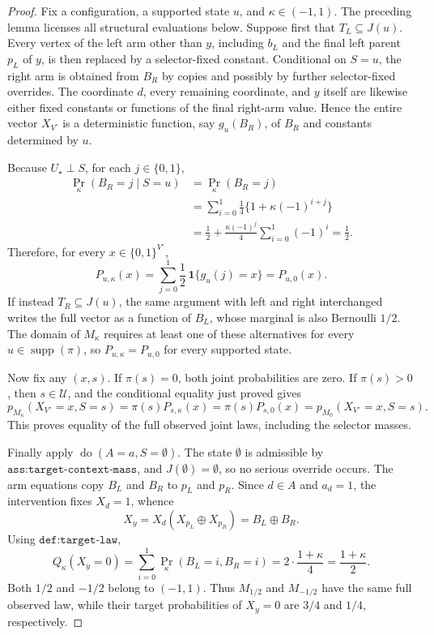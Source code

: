 \documentclass{article}
\begin{document}
\begin{proof}
Fix a configuration, a supported state \(u\), and \(\kappa\in(-1,1)\). The preceding lemma licenses all structural evaluations below. Suppose first that \(T_L\subseteq J(u)\). Every vertex of the left arm other than \(y\), including \(b_L\) and the final left parent \(p_L\) of \(y\), is then replaced by a selector-fixed constant. Conditional on \(S=u\), the right arm is obtained from \(B_R\) by copies and possibly by further selector-fixed overrides. The coordinate \(d\), every remaining coordinate, and \(y\) itself are likewise either fixed constants or functions of the final right-arm value. Hence the entire vector \(X_{V^\circ}\) is a deterministic function, say \(g_u(B_R)\), of \(B_R\) and constants determined by \(u\).

Because \(U_\star\perp S\), for each \(j\in\{0,1\}\),
\[
\begin{aligned}
\Pr_\kappa(B_R=j\mid S=u)
&=\Pr_\kappa(B_R=j)\\
&=\sum_{i=0}^1\frac14\{1+\kappa(-1)^{i+j}\}\\
&=\frac12+\frac{\kappa(-1)^j}{4}\sum_{i=0}^1(-1)^i=\frac12.
\end{aligned}
\]
Therefore, for every \(x\in\{0,1\}^{V^\circ}\),
\[
P_{u,\kappa}(x)=\sum_{j=0}^1\frac12\,\mathbf 1\{g_u(j)=x\}=P_{u,0}(x).
\]
If instead \(T_R\subseteq J(u)\), the same argument with left and right interchanged writes the full vector as a function of \(B_L\), whose marginal is also Bernoulli \(1/2\). The domain of \(M_\kappa\) requires at least one of these alternatives for every \(u\in\operatorname{supp}(\pi)\), so \(P_{u,\kappa}=P_{u,0}\) for every supported state.

Now fix any \((x,s)\). If \(\pi(s)=0\), both joint probabilities are zero. If \(\pi(s)>0\), then \(s\in\mathcal U\), and the conditional equality just proved gives
\[
p_{M_\kappa}(X_{V^\circ}=x,S=s)=\pi(s)P_{s,\kappa}(x)=\pi(s)P_{s,0}(x)=p_{M_0}(X_{V^\circ}=x,S=s).
\]
This proves equality of the full observed joint laws, including the selector masses.

Finally apply \(\operatorname{do}(A=a,S=\emptyset)\). The state \(\emptyset\) is admissible by \(\texttt{ass:target-context-mass}\), and \(J(\emptyset)=\emptyset\), so no serious override occurs. The arm equations copy \(B_L\) and \(B_R\) to \(p_L\) and \(p_R\). Since \(d\in A\) and \(a_d=1\), the intervention fixes \(X_d=1\), whence
\[
X_y=X_d(X_{p_L}\oplus X_{p_R})=B_L\oplus B_R.
\]
Using \(\texttt{def:target-law}\),
\[
Q_\kappa(X_y=0)=\sum_{i=0}^1\Pr_\kappa(B_L=i,B_R=i)=2\cdot\frac{1+\kappa}{4}=\frac{1+\kappa}{2}.
\]
Both \(1/2\) and \(-1/2\) belong to \((-1,1)\). Thus \(M_{1/2}\) and \(M_{-1/2}\) have the same full observed law, while their target probabilities of \(X_y=0\) are \(3/4\) and \(1/4\), respectively.
\end{proof}
\end{document}
